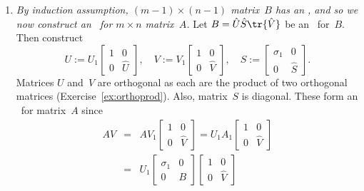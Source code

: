 \begin{enumerate}
\item \emph{By induction assumption, \((m-1)\times(n-1)\) matrix~\(B\) has an \svd, and so we now construct an \svd\ for \(m\times n\) matrix~\(A\).}
Let \(B=\hat U\hat S\tr{\hat V}\) be an \svd\ for~\(B\).
Then construct 
\begin{equation*}
U:=U_1\begin{bmatrix} 1&0\\0&\hat U \end{bmatrix},\quad
V:=V_1\begin{bmatrix} 1&0\\0&\hat V\end{bmatrix},\quad
S:=\begin{bmatrix} \sigma_1&0\\0&\hat S \end{bmatrix}.
\end{equation*}
Matrices \(U\) and~\(V\) are orthogonal as each are the product of two orthogonal matrices (Exercise~\ref{ex:orthoprod}).
Also, matrix~\(S\) is diagonal.
These form an \svd\ for matrix~\(A\) since
\begin{eqnarray*}
AV&=&AV_1\begin{bmatrix} 1&0\\0&\hat V\end{bmatrix}
=U_1A_1\begin{bmatrix} 1&0\\0&\hat V\end{bmatrix}
\\&=&U_1\begin{bmatrix} \sigma_1&0 \\0&B \end{bmatrix}\begin{bmatrix} 1&0\\0&\hat V\end{bmatrix}

\end{eqnarray*}
\end{enumerate}
